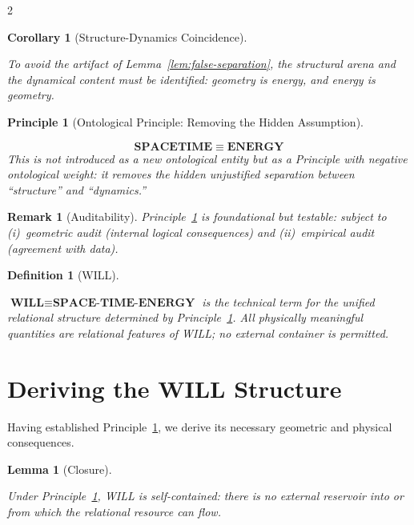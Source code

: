 \documentclass[10pt, a4paper]{article}
\newtheorem{lemma}[theorem]{Lemma}
\newtheorem{corollary}[theorem]{Corollary}
\newtheorem{definition}[theorem]{Definition}
\newtheorem{remark}[theorem]{Remark}
\newtheorem{principle}[theorem]{Principle}
\begin{document}
\begin{multicols}{2}
\begin{corollary}[Structure-Dynamics Coincidence]
\hypertarget{cor:coincidence}{}\label{cor:coincidence}
To avoid the artifact of Lemma~\ref{lem:false-separation}, the structural arena and the dynamical content must be identified: geometry \emph{is} energy, and energy \emph{is} geometry.
\end{corollary}

\begin{principle}[Ontological Principle: Removing the Hidden Assumption]
\hypertarget{pr:unifying}{}\label{pr:unifying}
\[
\boxed{\textbf{SPACETIME} \;\equiv\; \textbf{ENERGY}}
\]
This is not introduced as a new ontological entity but as a Principle with \emph{negative ontological weight}: it removes the hidden unjustified separation between ``structure'' and ``dynamics.''
\end{principle}

\begin{remark}[Auditability]
Principle~\ref{pr:unifying} is foundational but testable: subject to (i)~geometric audit (internal logical consequences) and (ii)~empirical audit (agreement with data).
\end{remark}

\begin{definition}[WILL]
\hypertarget{def:will}{}\label{def:will}
$\textbf{WILL}\equiv\textbf{SPACE-TIME-ENERGY}$ is the technical term for the unified relational structure determined by Principle~\ref{pr:unifying}. All physically meaningful quantities are relational features of WILL; no external container is permitted.
\end{definition}



\section{Deriving the WILL Structure}
\hypertarget{sec:WILL_structure}{}\label{sec:WILL_structure}

Having established Principle~\ref{pr:unifying}, we derive its necessary geometric and physical consequences.

\begin{lemma}[Closure]
\hypertarget{lem:closure}{}\label{lem:closure}
Under Principle~\ref{pr:unifying}, WILL is self-contained: there is no external reservoir into or from which the relational resource can flow.
\end{lemma}


\end{multicols}
\end{document}
